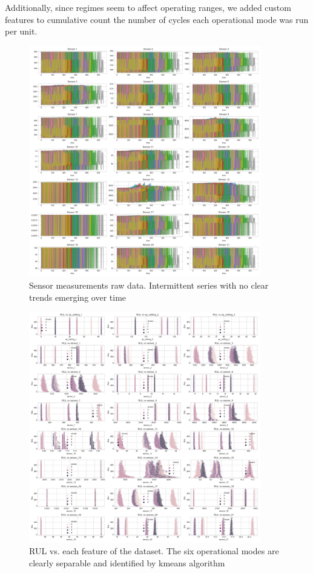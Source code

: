 \documentclass[letterpaper, 10 pt, conference, onecolumn]{ieeeconf}  %
\begin{document}
Additionally, since regimes seem to affect operating ranges, we added custom features to cumulative count the number of cycles each operational mode was run per unit.


\begin{figure}[!h]
    \centering
    \includegraphics[width=0.9\textwidth]{plots/eda_sensors_raw.png}
    \caption{Sensor measurements raw data. Intermittent series with no clear trends emerging over time}
    \label{fig:sensors-raw}
\end{figure}

\begin{figure}[!h]
    \centering
    \includegraphics[width=0.9\textwidth]{plots/eda_scatters_cluster.png}
    \caption{RUL vs. each feature of the dataset. The six operational modes are clearly separable and identified by kmeans algorithm}
    \label{fig:rul-features-scatter-cluster}
\end{figure}
\end{document}
